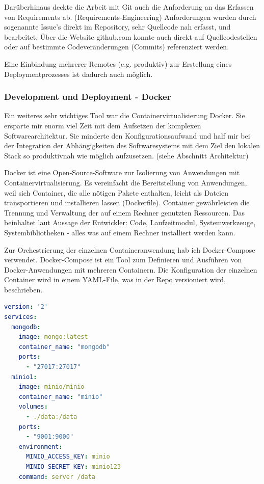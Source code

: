 \documentclass[12pt]{article}
\begin{document}
Darüberhinaus deckte die Arbeit mit Git auch die Anforderung an das Erfassen von Requirements ab. (Requirements-Engineering) Anforderungen wurden durch sogenannte Issue's direkt im Repository, sehr Quellcode nah erfasst, und bearbeitet. Über die Website github.com konnte auch direkt auf Quellcodestellen oder auf bestimmte Codeveränderungen (Commits) referenziert werden.

Eine Einbindung mehrerer Remotes (e.g. produktiv) zur Erstellung eines Deploymentprozesses ist dadurch auch möglich.




\subsubsection{Development und Deployment - Docker}

Ein weiteres sehr wichtiges Tool war die Containervirtualisierung Docker. Sie ersparte mir enorm viel Zeit mit dem Aufsetzen der komplexen Softwarearchitektur. Sie minderte den Konfigurationsaufwand und half mir bei der Integration der Abhängigkeiten des Softwaresystems mit dem Ziel den lokalen Stack so produktivnah wie möglich aufzusetzen. (siehe Abschnitt Architektur)

Docker ist eine Open-Source-Software zur Isolierung von Anwendungen mit Containervirtualisierung. Es vereinfacht die Bereitstellung von Anwendungen, weil sich Container, die alle nötigen Pakete enthalten, leicht als Dateien transportieren und installieren lassen (Dockerfile). Container gewährleisten die Trennung und Verwaltung der auf einem Rechner genutzten Ressourcen. Das beinhaltet laut Aussage der Entwickler: Code, Laufzeitmodul, Systemwerkzeuge, Systembibliotheken - alles was auf einem Rechner installiert werden kann.

Zur Orchestrierung der einzelnen Containeranwendung hab ich Docker-Compose verwendet. Docker-Compose ist ein Tool zum Definieren und Ausführen von Docker-Anwendungen mit mehreren Containern. Die Konfiguration der einzelnen Container wird in einem YAML-File, was in der Repo versioniert wird, beschrieben.

\bigbreak


\lstset{basicstyle=\ttfamily}
\lstset{xleftmargin=.2\textwidth, xrightmargin=.2\textwidth}
\begin{lstlisting}[language=yaml,frame=single]
version: '2'
services:
  mongodb:
    image: mongo:latest
    container_name: "mongodb"
    ports:
      - "27017:27017"
  minio1:
    image: minio/minio
    container_name: "minio"
    volumes:
      - ./data:/data
    ports:
      - "9001:9000"
    environment:
      MINIO_ACCESS_KEY: minio
      MINIO_SECRET_KEY: minio123
    command: server /data
\end{lstlisting}
\end{document}
